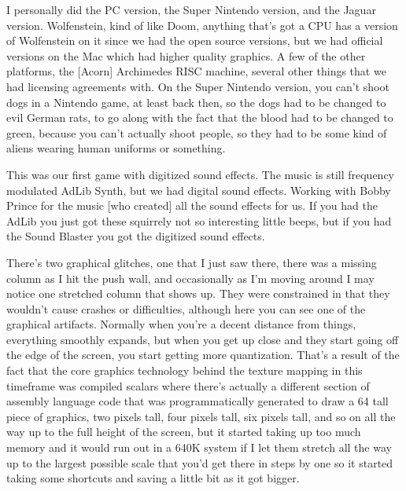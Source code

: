 I personally did the PC version, the Super Nintendo version, and the Jaguar version. Wolfenstein, kind of like Doom, anything that's got a CPU has a version of Wolfenstein on it since we had the open source versions, but we had official versions on the Mac which had higher quality graphics. A few of the other platforms, the [Acorn] Archimedes RISC machine, several other things that we had licensing agreements with. On the Super Nintendo version, you can't shoot dogs in a Nintendo game, at least back then, so the dogs had to be changed to evil German rats, to go along with the fact that the blood had to be changed to green, because you can't actually shoot people, so they had to be some kind of aliens wearing human uniforms or something.\\ \par 

This was our first game with digitized sound effects. The music is still frequency modulated AdLib Synth, but we had digital sound effects. Working with Bobby Prince for the music [who created] all the sound effects for us. If you had the AdLib you just got these squirrely not so interesting little beeps, but if you had the Sound Blaster you got the digitized sound effects.\\ \par 

There's two graphical glitches, one that I just saw there, there was a missing column as I hit the push wall, and occasionally as I'm moving around I may notice one stretched column that shows up. They were constrained in that they wouldn't cause crashes or difficulties, although here you can see one of the graphical artifacts. Normally when you're a decent distance from things, everything smoothly expands, but when you get up close and they start going off the edge of the screen, you start getting more quantization. That's a result of the fact that the core graphics technology behind the texture mapping in this timeframe was compiled scalars where there's actually a different section of assembly language code that was programmatically generated to draw a 64 tall piece of graphics, two pixels tall, four pixels tall, six pixels tall, and so on all the way up to the full height of the screen, but it started taking up too much memory and it would run out in a 640K system if I let them stretch all the way up to the largest possible scale that you'd get there in steps by one so it started taking some shortcuts and saving a little bit as it got bigger.\\ \par

